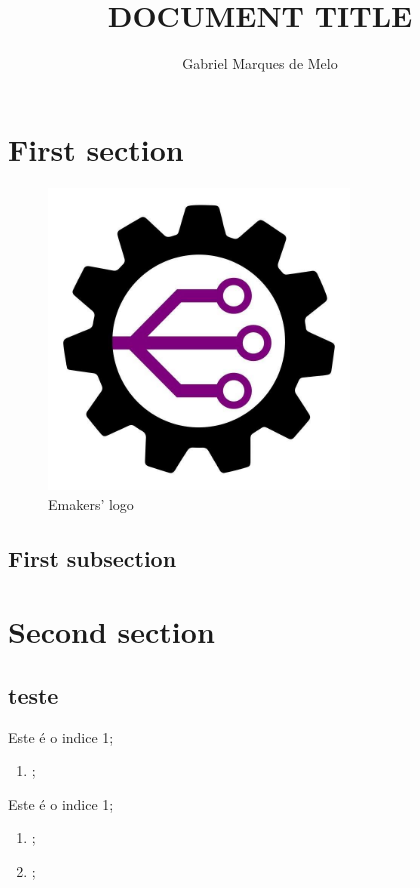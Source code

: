\documentclass[11pt,openright,twoside,a4paper,brazil, article]{abntex2}
\title{DOCUMENT TITLE}
\author{Gabriel Marques de Melo}
\begin{document}
    \maketitle
    \thispagestyle{emakers}


    \begin{changemargin}{2cm}{2cm}
    \section{First section}\label{sec:firstSection}
        \lipsum[1]

        \begin{figure}[!htb]
            \centering
            \includegraphics[width=8cm]{logo-emakers}
            \caption{Emakers' logo}
            \label{logo-emakers}
        \end{figure}

        \subsection{First subsection}\label{subsec:firstSubsection}
        \lipsum[1]

    \section{Second section}\label{sec:secondSection}
        \lipsum[1]
        \subsection{teste}
            \item Este é o indice 1;
            \begin{enumerate}
                \item \lipsum[1];

            \end{enumerate}
            \item Este é o indice 1;
            \begin{enumerate}
                \item \lipsum[1];
                \item \lipsum[1];
            \end{enumerate}
    \end{changemargin}
\end{document}
